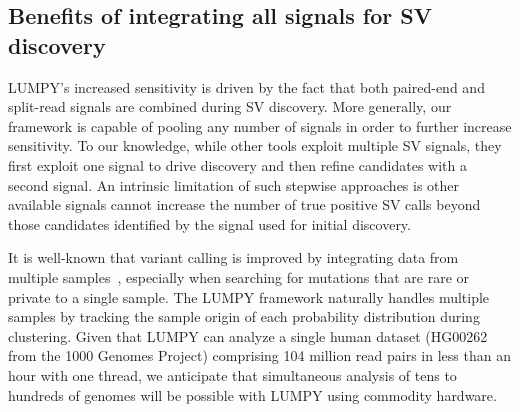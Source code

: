 \documentclass[10pt]{bmc_article}
\newenvironment{bmcformat}{\begin{raggedright}\baselineskip20pt\sloppy\setboolean{publ}{false}}{\end{raggedright}\baselineskip20pt\sloppy}
\begin{document}
\begin{bmcformat}
\subsection*{Benefits of integrating all signals for SV discovery}

LUMPY's increased sensitivity is driven by the fact that both paired-end and
split-read signals are combined during SV discovery. More generally, our
framework is capable of pooling any number of signals in order to further
increase sensitivity. To our knowledge, while other tools exploit multiple SV
signals, they first exploit one signal to drive discovery and then refine
candidates with a second signal. An intrinsic limitation of such stepwise
approaches is other available signals cannot increase the number of true
positive SV calls beyond those candidates identified by the signal used for
initial discovery. 

It is well-known that variant calling is improved by integrating data from
multiple samples~\cite{handsaker2011, mckenna2010, hormozdiari2011,
quinlan2011}, especially when searching for mutations that are rare or private
to a single sample. The LUMPY framework naturally handles multiple samples by
tracking the sample origin of each probability distribution during clustering.
Given that LUMPY can analyze a single human dataset (HG00262 from the 1000
Genomes Project) comprising 104 million read pairs in less than an hour with one
thread, we anticipate that simultaneous analysis of tens to hundreds of genomes
will be possible with LUMPY using commodity hardware.



\end{bmcformat}
\end{document}
